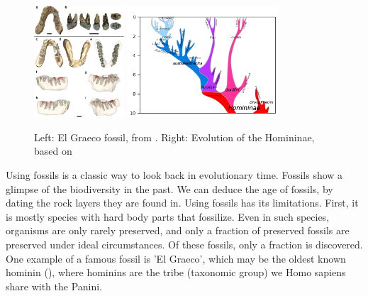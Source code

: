 \begin{figure}[H]
  \includegraphics[width=0.3\textwidth]{Graecopithecus.jpg}
  \includegraphics[width=0.5\textwidth]{Hominini_lineage.png}
  \caption{
    Left: El Graeco fossil, from \cite{fuss2017potential}.
    Right: Evolution of the Homininae, based on \cite{stringer2012makes}
 }
  \label{fig:human_evolution}
\end{figure}

Using fossils is a classic way to look back in evolutionary time.
Fossils show a glimpse of the biodiversity in the past.
We can deduce the age of fossils, by dating the rock layers they are found in.
Using fossils has its limitations. First, it is mostly species with hard body
parts that fossilize. Even in such species, organisms are 
only rarely preserved, and only a fraction of preserved fossils are preserved under ideal circumstances. Of 
these fossils, only a fraction is discovered.
One example of a famous fossil is 'El Graeco', 
which may be the oldest known hominin (\cite{fuss2017potential}), where
hominins are the tribe (taxonomic group) we Homo sapiens share with the Panini.

